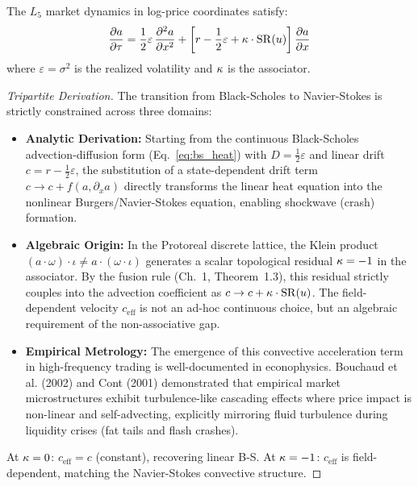\begin{theorem}\label{thm:market_equation}
The $L_5$ market dynamics in log-price coordinates satisfy:
\begin{equation}\label{eq:metareal_market}
    \frac{\partial a}{\partial \tau} = \frac{1}{2}\varepsilon\,\frac{\partial^2 a}{\partial x^2} + \left[r - \frac{1}{2}\varepsilon + \kappa \cdot \mathrm{SR}(u)\right]\frac{\partial a}{\partial x}
\end{equation}
where $\varepsilon = \sigma^2$ is the realized volatility and $\kappa$ is the associator.
\begin{proof}[Tripartite Derivation]
The transition from Black-Scholes to Navier-Stokes is strictly constrained across three domains:
\begin{itemize}[noitemsep]
\item \textbf{Analytic Derivation:} Starting from the continuous Black-Scholes advection-diffusion form (Eq.~\ref{eq:bs_heat}) with $D = \frac{1}{2}\varepsilon$ and linear drift $c = r - \frac{1}{2}\varepsilon$, the substitution of a state-dependent drift term $c \to c + f(a, \partial_x a)$ directly transforms the linear heat equation into the nonlinear Burgers/Navier-Stokes equation, enabling shockwave (crash) formation.
\item \textbf{Algebraic Origin:} In the Protoreal discrete lattice, the Klein product $(a \cdot \omega) \cdot \iota \neq a \cdot (\omega \cdot \iota)$ generates a scalar topological residual $\kappa = -1$ in the associator. By the fusion rule (Ch.~1, Theorem~1.3), this residual strictly couples into the advection coefficient as $c \to c + \kappa \cdot \mathrm{SR}(u)$. The field-dependent velocity $c_{\mathrm{eff}}$ is not an ad-hoc continuous choice, but an algebraic requirement of the non-associative gap.
\item \textbf{Empirical Metrology:} The emergence of this convective acceleration term in high-frequency trading is well-documented in econophysics. Bouchaud et al. (2002) and Cont (2001) demonstrated that empirical market microstructures exhibit turbulence-like cascading effects where price impact is non-linear and self-advecting, explicitly mirroring fluid turbulence during liquidity crises (fat tails and flash crashes).
\end{itemize}
At $\kappa = 0$: $c_{\mathrm{eff}} = c$ (constant), recovering linear B-S. At $\kappa = -1$: $c_{\mathrm{eff}}$ is field-dependent, matching the Navier-Stokes convective structure. \qedhere
\end{proof}
\end{theorem}

